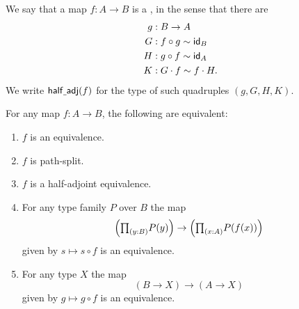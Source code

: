 \begin{defn}
We say that a map $f:A\to B$ is a , in the sense that there are
\begin{align*}
g & : B \to A\\
G & : f\circ g \htpy \idfunc[B] \\
H & : g\circ f \htpy \idfunc[A] \\
K & : G\cdot f \htpy f\cdot H.
\end{align*}
We write $\mathsf{half\usc{}adj}(f)$ for the type of such quadruples $(g,G,H,K)$.
\end{defn}

\begin{prp}\label{ex:equiv_precomp}
For any map $f:A\to B$, the following are equivalent:
\begin{enumerate}
\item $f$ is an equivalence.
\item $f$ is path-split.
\item $f$ is a half-adjoint equivalence.
\item For any type family $P$ over $B$ the map
\begin{equation*}
\Big(\prd{y:B}P(y)\Big)\to\Big(\prd{x:A}P(f(x))\Big)
\end{equation*}
given by $s\mapsto s\circ f$ is an equivalence.
\item For any type $X$ the map
\begin{equation*}
(B\to X)\to (A\to X)
\end{equation*}
given by $g\mapsto g\circ f$ is an equivalence. 
\end{enumerate}
\end{prp}

